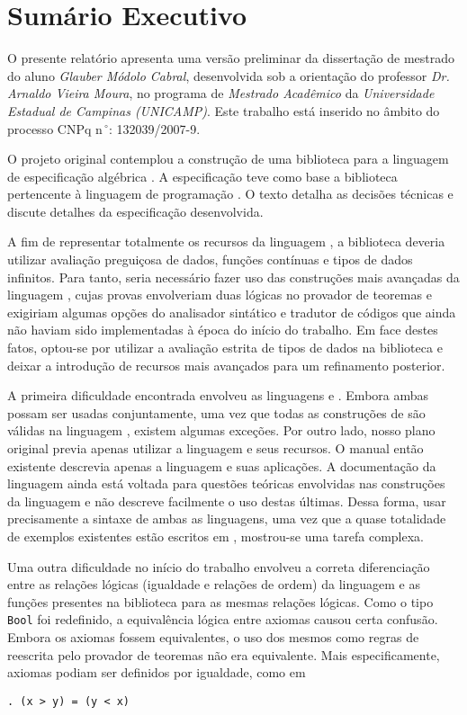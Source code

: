\chapter{Sumário Executivo}
\label{chap:sumario}

O presente relatório apresenta uma versão preliminar da dissertação de mestrado do aluno \textit{Glauber Módolo Cabral}, desenvolvida sob a orientação do professor \textit{Dr. Arnaldo Vieira Moura}, no programa de \textit{Mestrado Acadêmico} da \textit{Universidade Estadual de Campinas (UNICAMP)}.
Este trabalho está inserido no âmbito do processo CNPq n$\,^{\circ}$: 132039/2007-9.

O projeto original contemplou a construção de uma biblioteca para a linguagem de especificação algébrica \HasCASL.
A especificação teve como base a biblioteca \Prelude pertencente à linguagem de programação \Haskell.
O texto detalha as decisões técnicas e discute detalhes da especificação desenvolvida.

A fim de representar totalmente os recursos da linguagem \Haskell, a biblioteca deveria utilizar avaliação preguiçosa de dados, funções contínuas e tipos de dados infinitos.
Para tanto, seria necessário fazer uso das construções mais avançadas da linguagem \HasCASL, cujas provas envolveriam duas lógicas no provador de teoremas \Isabelle e exigiriam algumas opções do analisador sintático e tradutor de códigos \Hets que ainda não haviam sido implementadas à época do início do trabalho.
Em face destes fatos, optou-se por utilizar a avaliação estrita de tipos de dados na biblioteca e deixar a introdução de recursos mais avançados para um refinamento posterior.

A primeira dificuldade encontrada envolveu as linguagens \CASL e \HasCASL.
Embora ambas possam ser usadas conjuntamente, uma vez que todas as construções de \CASL são válidas na linguagem \HasCASL, existem algumas exceções.
Por outro lado, nosso plano original previa apenas utilizar a linguagem \HasCASL e seus recursos.
O manual então existente descrevia apenas a linguagem \CASL e suas aplicações.
A documentação da linguagem \HasCASL ainda está voltada para questões teóricas envolvidas nas construções da linguagem e não descreve facilmente o uso destas últimas.
Dessa forma, usar precisamente a sintaxe de ambas as linguagens, uma vez que a quase totalidade de exemplos existentes estão escritos em \CASL, mostrou-se uma tarefa complexa.

Uma outra dificuldade no início do trabalho envolveu a correta diferenciação entre as relações lógicas (igualdade e relações de ordem) da linguagem \HasCASL e as funções presentes na biblioteca para as mesmas relações lógicas.
Como o tipo \Verb.Bool. foi redefinido, a equivalência lógica entre axiomas causou certa confusão.
Embora os axiomas fossem equivalentes, o uso dos mesmos como regras de reescrita pelo provador de teoremas não era equivalente.
Mais especificamente, axiomas podiam ser definidos por igualdade, como em
\begin{Verbatim}
. (x > y) = (y < x)
\end{Verbatim}

